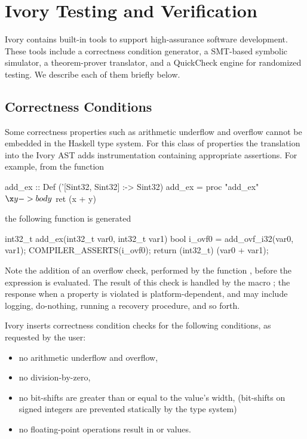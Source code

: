 \section{Ivory Testing and Verification}
\label{sec:tools}

Ivory contains built-in tools to support high-assurance software
development. These tools include a correctness condition generator, a
SMT-based symbolic simulator, a theorem-prover translator, and a
QuickCheck\cite{qc} engine for randomized testing. We describe each of
them briefly below.


\subsection{Correctness Conditions}
Some correctness properties such as arithmetic underflow and overflow
cannot be embedded in the Haskell type system. For this class of
properties the translation into the Ivory AST adds instrumentation
containing appropriate assertions. For example, from the function

\begin{code}
add_ex :: Def ('[Sint32, Sint32] :-> Sint32)
add_ex = proc "add_ex" $ \x y -> body $
  ret (x + y)
\end{code}
\noindent
the following function is generated
\begin{code}
int32_t add_ex(int32_t var0, int32_t var1)
{
    bool i_ovf0 = add_ovf_i32(var0, var1);
    COMPILER_ASSERTS(i_ovf0);
    return (int32_t) (var0 + var1);
}
\end{code}
\noindent
Note the addition of an overflow check, performed by the function
, before the expression is evaluated. The result of
this check is handled by the macro
; the response when a property is
violated is platform-dependent, and may include logging, do-nothing, running a
recovery procedure, and so forth.

Ivory inserts correctness condition checks for the following conditions, as requested by
the user:
\begin{itemize}
\item no arithmetic underflow and overflow,
\item no division-by-zero,
\item no bit-shifts are greater than or equal to the value's width,
  (bit-shifts on signed integers are prevented statically by the type system)
\item no floating-point operations result in  or  values.
\end{itemize}

